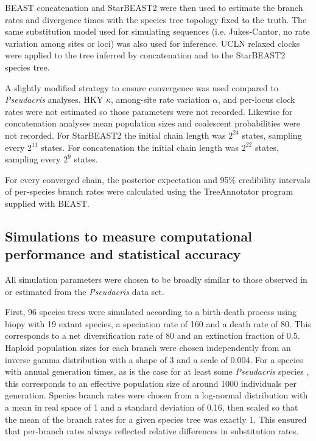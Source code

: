 \documentclass[12pt]{article}
\begin{document}
BEAST concatenation and StarBEAST2 were then used to estimate the branch rates
and divergence times with the species tree topology fixed to the truth. The same
substitution model used for simulating sequences (i.e. Jukes-Cantor, no rate
variation among sites or loci) was also used for inference. UCLN relaxed
clocks were applied to the tree inferred by concatenation and to the
StarBEAST2 species tree.

A slightly modified strategy to ensure convergence was used compared to
\textit{Pseudacris} analyses. HKY $\kappa$, among-site rate variation $\alpha$,
and per-locus clock rates were not estimated so those parameters were not
recorded. Likewise for concatenation analyses mean population sizes and coalescent
probabilities were not recorded. For StarBEAST2 the initial chain length was
$2^{24}$ states, sampling every $2^{11}$ states. For concatenation the initial
chain length was $2^{22}$ states, sampling every $2^{9}$ states.

For every converged chain, the posterior expectation and 95\% credibility
intervals of per-species branch rates were calculated using the TreeAnnotator
program supplied with BEAST.

\subsection{Simulations to measure computational performance and statistical accuracy}

All simulation parameters were chosen to be broadly similar to those observed in
or estimated from the \textit{Pseudacris} data set.

First, 96 species trees were simulated according to a birth-death process
\citep{Gernhard2008769} using biopy with 19 extant species, a speciation rate of
160 and a death rate of 80. This corresponds to a net diversification rate
of 80 and an extinction fraction of 0.5. Haploid population sizes
for each branch were chosen independently from an inverse gamma distribution
with a shape of 3 and a scale of 0.004. For a species with annual generation
times, as is the case for at least some \textit{Pseudacris} species
\citep{10.2307/1446044}, this corresponds to an effective population size
of around 1000 individuals per generation. Species branch rates were chosen from a
log-normal distribution with a mean in real space of 1 and a standard
deviation of 0.16, then scaled so that the mean of the branch rates for a given
species tree was exactly 1. This ensured that per-branch rates always reflected
relative differences in substitution rates.
\end{document}
